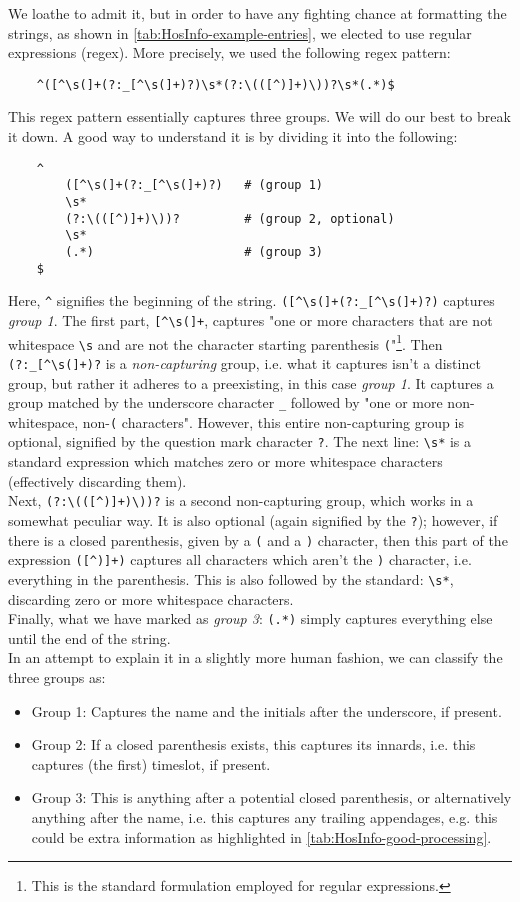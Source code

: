 We loathe to admit it, but in order to have any fighting chance at formatting the strings, as shown in \autoref{tab:HosInfo-example-entries}, we elected to use regular expressions (regex). More precisely, we used the following regex pattern:
\begin{verbatim}
    ^([^\s(]+(?:_[^\s(]+)?)\s*(?:\(([^)]+)\))?\s*(.*)$
\end{verbatim}
This regex pattern essentially captures three groups. We will do our best to break it down. A good way to understand it is by dividing it into the following:
\begin{verbatim}
    ^
        ([^\s(]+(?:_[^\s(]+)?)   # (group 1)
        \s*
        (?:\(([^)]+)\))?         # (group 2, optional)
        \s*
        (.*)                     # (group 3)
    $
\end{verbatim}
Here, \verb|^| signifies the beginning of the string. \verb|([^\s(]+(?:_[^\s(]+)?)| captures \emph{group 1}. The first part, \verb|[^\s(]+|, captures "one or more characters that are not whitespace \verb|\s| and are not the character starting parenthesis \verb|(|"\footnote{This is the standard formulation employed for regular expressions.}. Then \verb|(?:_[^\s(]+)?| is a \emph{non-capturing} group, i.e. what it captures isn't a distinct group, but rather it adheres to a preexisting, in this case \emph{group 1}. It captures a group matched by the underscore character \verb|_| followed by "one or more non-whitespace, non-\verb|(| characters". However, this entire non-capturing group is optional, signified by the question mark character \verb|?|. The next line: \verb|\s*| is a standard expression which matches zero or more whitespace characters (effectively discarding them).
\\
Next, \verb|(?:\(([^)]+)\))?| is a second non-capturing group, which works in a somewhat peculiar way. It is also optional (again signified by the \verb|?|); however, if there is a closed parenthesis, given by a \verb|(| and a \verb|)| character, then this part of the expression \verb|([^)]+)| captures all characters which aren't the \verb|)| character, i.e. everything in the parenthesis. This is also followed by the standard: \verb|\s*|, discarding zero or more whitespace characters.
\\
Finally, what we have marked as \emph{group 3}: \verb|(.*)| simply captures everything else until the end of the string.
\\
In an attempt to explain it in a slightly more human fashion, we can classify the three groups as:
\begin{itemize}
	\item Group 1: Captures the name and the initials after the underscore, if present.
	\item Group 2: If a closed parenthesis exists, this captures its innards, i.e. this captures (the first) timeslot, if present.
	\item Group 3: This is anything after a potential closed parenthesis, or alternatively anything after the name, i.e. this captures any trailing appendages, e.g. this could be extra information as highlighted in \autoref{tab:HosInfo-good-processing}.
\end{itemize}
